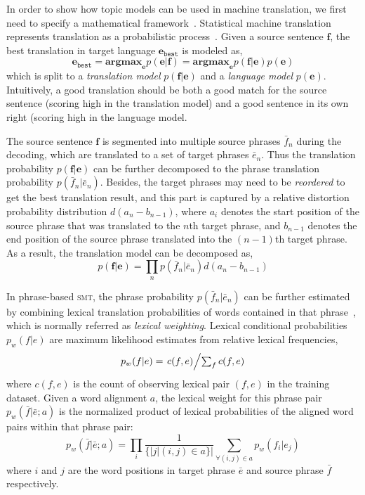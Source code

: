 In order to show how topic models can be used in machine translation, we first need to specify a mathematical framework~\citep{koehn-03}.
Statistical machine translation represents translation as a
probabilistic process~\citep{koehn-09}.  Given a source sentence $\mathbf{f}$, the best
translation in target language $\mathbf{e}_\texttt{best}$ is modeled
as,
\begin{equation}
\mathbf{e}_\texttt{best} = \textbf{argmax}_\mathbf{e} p(\mathbf{e}|\mathbf{f}) = \textbf{argmax}_\mathbf{e} p(\mathbf{f}|\mathbf{e}) p (\mathbf{e})
\end{equation}
which is split to a \textit{translation model}
$p(\mathbf{f}|\mathbf{e})$ and a \textit{language model} $p
(\mathbf{e})$.
Intuitively, a good translation should be both a good match for the source sentence (scoring high in the translation model) and a good sentence in its own right (scoring high in the language model.

The source sentence $\mathbf{f}$ is segmented into multiple source
phrases $\bar{f}_n$ during the decoding, which are translated to a set
of target phrases $\bar{e}_n$. Thus the translation probability
$p(\mathbf{f}|\mathbf{e})$ can be further decomposed to the phrase
translation probability $p(\bar{f}_n | \bar{e}_n)$. Besides, the
target phrases may need to be \textit{reordered} to get the best
translation result, and this part is captured by a relative distortion
probability distribution $d(a_n - b_{n-1})$, where $a_i$ denotes the
start position of the source phrase that was translated to the $n$th
target phrase, and $b_{n-1}$ denotes the end position of the source
phrase translated into the $(n-1)$th target phrase. As a result, the
translation model can be decomposed as,
\begin{equation}
p(\mathbf{f}|\mathbf{e}) = \prod_{n} p(\bar{f}_n | \bar{e}_n) d(a_n - b_{n-1})
\end{equation}

In phrase-based \textsc{smt}, the phrase probability $p(\bar{f}_n |
\bar{e}_n)$ can be further estimated by combining lexical translation
probabilities of words contained in that phrase~\citep{koehn-03},
which is normally referred as \textit{lexical weighting}. Lexical
conditional probabilities $p_w(f|e)$ are maximum likelihood estimates
from relative lexical frequencies,
\begin{equation}
\label{eq:lexical_prob}
p_w(f|e) = \textstyle \left.c(f, e)\middle/\sum_f{c(f, e)}\right.
\end{equation}
where $c(f, e)$ is the count of observing lexical pair $(f, e)$ in the
training dataset. Given a word alignment $a$, the lexical weight for
this phrase pair $p_w(\bar{f} | \bar{e}; a)$ is the normalized product
of lexical probabilities of the aligned word pairs within that phrase
pair:
\begin{equation}
\label{eq:phrase_prob}
p_w(\bar{f} | \bar{e}; a) = \prod_{i} \frac{1}{\{|j | (i, j) \in a\}|} \sum_{\forall (i,j) \in a} p_w(f_i | e_j)
\end{equation}
where $i$ and $j$ are the word positions in target phrase $\bar{e}$
and source phrase $\bar{f}$ respectively.


